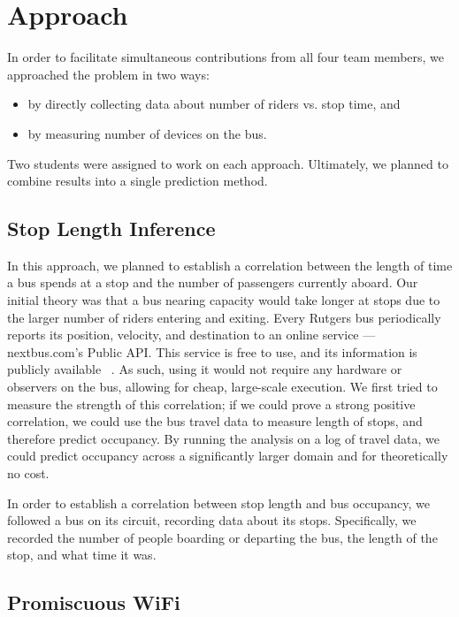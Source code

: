 \section{Approach}

In order to facilitate simultaneous contributions from all four team members, we approached the problem in two ways:
\begin{itemize}
  \item by directly collecting data about number of riders vs. stop time, and
  \item by measuring number of devices on the bus.
\end{itemize}
Two students were assigned to work on each approach.
Ultimately, we planned to combine results into a single prediction method.

\subsection{Stop Length Inference} \label{sec:sl-approach}

In this approach, we planned to establish a correlation between the length of time a bus spends at a stop and the number of passengers currently aboard.
Our initial theory was that a bus nearing capacity would take longer at stops due to the larger number of riders entering and exiting.
Every Rutgers bus periodically reports its position, velocity, and destination to an online service --- nextbus.com's Public API.
This service is free to use, and its information is publicly available ~\cite{nextbus}. %
As such, using it would not require any hardware or observers on the bus, allowing for cheap, large-scale execution.
We first tried to measure the strength of this correlation; if we could prove a strong positive correlation, we could use the bus travel data to measure length of stops, and therefore predict occupancy.
By running the analysis on a log of travel data, we could predict occupancy across a significantly larger domain and for theoretically no cost.

In order to establish a correlation between stop length and bus occupancy, we followed a bus on its circuit, recording data about its stops. Specifically, we recorded the number of people boarding or departing the bus, the length of the stop, and what time it was.

\newpage

\subsection{Promiscuous WiFi}

